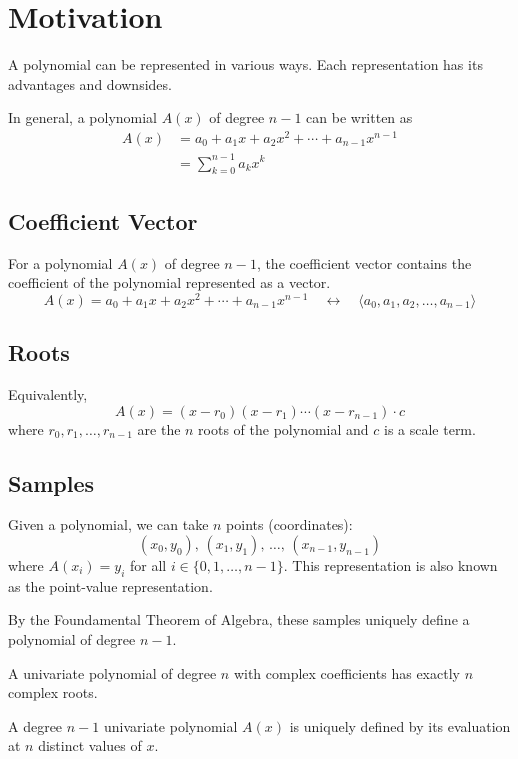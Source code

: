 \section{Motivation}
A polynomial can be represented in various ways. Each representation has its advantages and downsides.

In general, a polynomial $A(x)$ of degree $n-1$ can be written as
$$
\begin{aligned}
    A(x) &= a_0 + a_1x + a_2x^2 + \cdots + a_{n-1}x^{n-1} \\
    &= \sum_{k=0}^{n-1} a_k x^k
\end{aligned}
$$

\subsection{Coefficient Vector}

For a polynomial $A(x)$ of degree $n-1$, the coefficient vector contains the coefficient of the polynomial represented as a vector.
$$
A(x) = a_0 + a_1 x + a_2 x^2 + \cdots + a_{n-1}x^{n-1} \quad  \leftrightarrow \quad \langle a_0,a_1,a_2,\ldots,a_{n-1} \rangle
$$

\subsection{Roots}

Equivalently,
$$
A(x) = (x-r_0) (x-r_1) \cdots (x - r_{n-1}) \cdot c
$$
where $r_0,r_1,\ldots,r_{n-1}$ are the $n$ roots of the polynomial and $c$ is a scale term.

\subsection{Samples}

Given a polynomial, we can take $n$ points (coordinates): 
$$
(x_0,y_0),\, (x_1,y_1),\, \ldots ,\, (x_{n-1},y_{n-1})
$$
where $A(x_i)=y_i$ for all $i \in \{0,1,\ldots,n-1\}$. This representation is also known as the point-value representation.

By the Foundamental Theorem of Algebra, these samples uniquely define a polynomial of degree $n-1$.

\begin{theorem}
    A univariate polynomial of degree $n$ with complex coefficients has exactly $n$ complex roots.
\end{theorem}

\begin{corollary}
    A degree $n-1$ univariate polynomial $A(x)$ is uniquely defined by its evaluation at $n$ distinct values of $x$.
\end{corollary}

